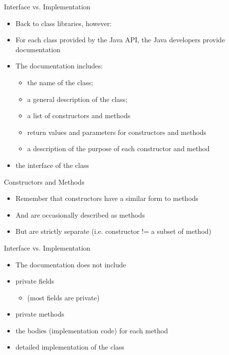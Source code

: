 \documentclass{beamer}
\begin{document}
\begin{frame}

Interface vs. Implementation

\begin{itemize}
\item Back to class libraries, however:
\item For each class provided by the Java API, the Java developers provide documentation
\item The documentation includes:

\begin{itemize}
\item the name of the class;
\item a general description of the class;
\item a list of constructors and methods
\item return values and parameters for constructors and methods
\item a description of the purpose of each constructor and method
\end{itemize}
\item the interface of the class
\end{itemize}

\end{frame} \begin{frame}

Constructors and Methods

\begin{itemize}
\item Remember that constructors have a similar form to methods
\item And are occasionally described as methods
\item But are strictly separate (i.e. constructor != a subset of method)
\end{itemize}

\end{frame} \begin{frame}

Interface vs. Implementation
\begin{itemize}
\item The documentation does not include
\item private fields 

\begin{itemize}
\item (most fields are private) 
\end{itemize}
\item private methods
\item the bodies (implementation code) for each method
\item detailed implementation of the class
\end{itemize}


\end{frame}
\end{document}
